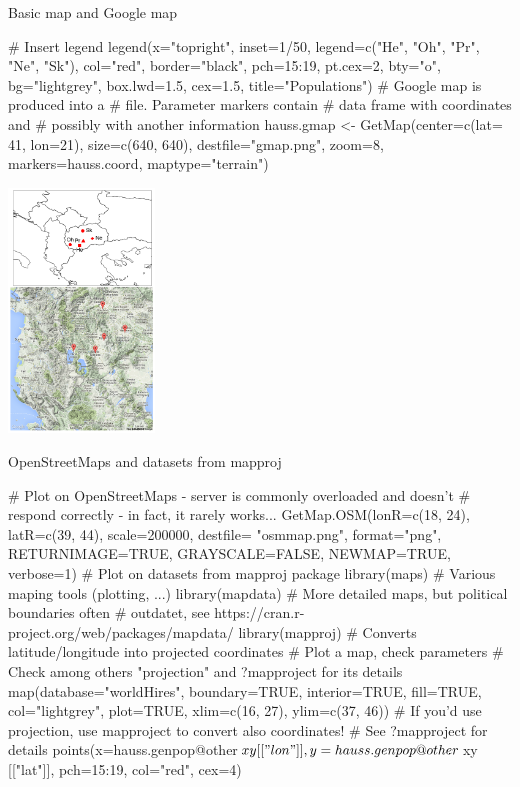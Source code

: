 \documentclass[compress, ucs, xelatex, 11pt, xcolor=svgnames,
  hyperref={
    bookmarks=true,
    unicode=true,
    colorlinks=true,
    pdftitle={Molecular data in R},
    plainpages=false,
    pdfauthor={Vojtech Zeisek},
    pdfsubject={Course about phylogeny and evolution in R},
    pdfcreator={XeLaTeX},
    pdfkeywords={R, evolution, phylogeny, molecular data},
    linkcolor=Tomato,
    anchorcolor=SaddleBrown,
    citecolor=Goldenrod,
    filecolor=DarkMagenta,
    menucolor=Sienna,
    urlcolor=DarkTurquoise,
    pdftex},
  url={hyphens, lowtilde} %
  ]{beamer}
\begin{document}
\begin{frame}[fragile]{Basic map and Google map}
\begin{multicols}{2}
  \begin{spluscode}
    # Insert legend
    legend(x="topright", inset=1/50,
      legend=c("He", "Oh", "Pr", "Ne",
      "Sk"), col="red", border="black",
      pch=15:19, pt.cex=2, bty="o",
      bg="lightgrey", box.lwd=1.5,
      cex=1.5, title="Populations")
    # Google map is produced into a
    # file. Parameter markers contain
    # data frame with coordinates and
    # possibly with another information
    hauss.gmap <- GetMap(center=c(lat=
      41, lon=21), size=c(640, 640),
      destfile="gmap.png", zoom=8,
      markers=hauss.coord,
      maptype="terrain")
  \end{spluscode}
  \begin{center}
    \includegraphics[height=6.5cm]{maps.png}
  \end{center}
\end{multicols}
\end{frame}

\begin{frame}[fragile]{OpenStreetMaps and datasets from mapproj}
  \begin{spluscode}
    # Plot on OpenStreetMaps - server is commonly overloaded and doesn't
    # respond correctly - in fact, it rarely works...
    GetMap.OSM(lonR=c(18, 24), latR=c(39, 44), scale=200000, destfile=
      "osmmap.png", format="png", RETURNIMAGE=TRUE, GRAYSCALE=FALSE,
      NEWMAP=TRUE, verbose=1)
    # Plot on datasets from mapproj package
    library(maps) # Various maping tools (plotting, ...)
    library(mapdata) # More detailed maps, but political boundaries often
          # outdatet, see https://cran.r-project.org/web/packages/mapdata/
    library(mapproj) # Converts latitude/longitude into projected coordinates
    # Plot a map, check parameters
    # Check among others "projection" and ?mapproject for its details
    map(database="worldHires", boundary=TRUE, interior=TRUE, fill=TRUE,
      col="lightgrey", plot=TRUE, xlim=c(16, 27), ylim=c(37, 46))
    # If you'd use projection, use mapproject to convert also coordinates!
    # See ?mapproject for details
    points(x=hauss.genpop@other$xy[["lon"]], y=hauss.genpop@other$xy
      [["lat"]], pch=15:19, col="red", cex=4)
  \end{spluscode}
\end{frame}
\end{document}
